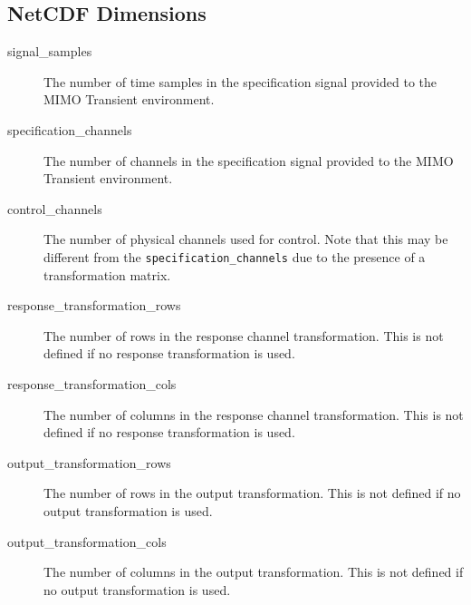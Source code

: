 \documentclass[pdf,12pt,report]{SANDreport}
\newcommand{\inlineCode}{\lstinline[basicstyle=\bfseries\ttfamily]}
\begin{document}
    \subsection{NetCDF Dimensions}
    \begin{description}
        \item[signal\_samples] The number of time samples in the specification signal provided to the \Ac{MIMO} Transient environment.
       \item[specification\_channels] The number of channels in the specification signal provided to the \Ac{MIMO} Transient environment.
       \item[control\_channels] The number of physical channels used for control.  Note that this may be different from the \inlineCode{specification_channels} due to the presence of a transformation matrix.
       \item[response\_transformation\_rows] The number of rows in the response channel transformation.  This is not defined if no response transformation is used.
       \item[response\_transformation\_cols] The number of columns in the response channel transformation.  This is not defined if no response transformation is used.
       \item[output\_transformation\_rows] The number of rows in the output transformation.  This is not defined if no output transformation is used.
       \item[output\_transformation\_cols] The number of columns in the output transformation.  This is not defined if no output transformation is used.
    \end{description}
    
\end{document}
